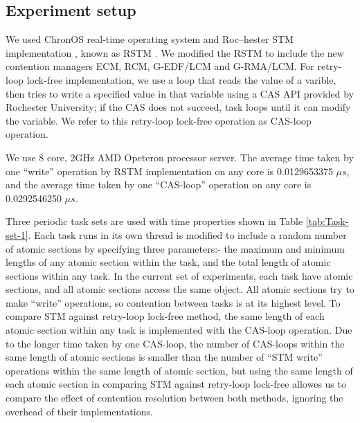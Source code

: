 \documentclass[conference]{sig-alternate}
\begin{document}
\subsection{Experiment setup}
We used ChronOS real-time operating system \cite{dellinger2011chronos}
and Roc--hester STM implementation \cite{marathe2006lowering}, known
as RSTM . We modified the RSTM to include the new contention managers
ECM, RCM, G-EDF/LCM and G-RMA/LCM. For retry-loop lock-free implementation,
we use a loop that reads the value of a varible, then tries to write
a specified value in that variable using a CAS API provided by Rochester
University; if the CAS does not succeed, task loops until it can modify
the variable. We refer to this retry-loop lock-free operation as CAS-loop
operation.

We use 8 core, 2GHz AMD Opeteron processor server. The average time
taken by one {}``write'' operation by RSTM implementation on any
core is 0.0129653375 \textbf{$\mu s$}, and the average time taken
by one {}``CAS-loop'' operation on any core is 0.0292546250 $\mu s$.

Three periodic task sets are used with time properties shown in Table
\ref{tab:Task-set-1}. Each task runs in its own thread is modified to include a random number
of atomic sections by specifying three parameters:- the maximum and
minimum lengths of any atomic section within the task, and the total
length of atomic sections within any task. In the current set of experiments, each task have atomic sections, and all atomic sections access the same object. All atomic sections
try to make ``write'' operations, so contention between tasks is at its highest
level. To compare STM against retry-loop lock-free method, the same
length of each atomic section within any task is implemented with
the CAS-loop operation. Due to the longer time taken by one CAS-loop,
the number of CAS-loops within the same length of atomic sections
is smaller than the number of {}``STM write'' operations within
the same length of atomic section, but using the same length of each
atomic section in comparing STM against retry-loop lock-free allowes
us to compare the effect of contention resolution between both methods,
ignoring the overhead of their implementations.
\end{document}
